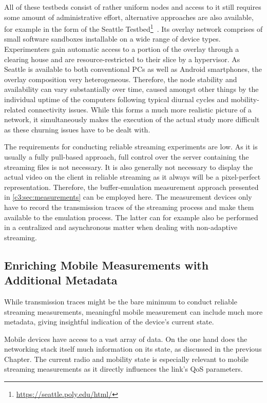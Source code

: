 All of these testbeds consist of rather uniform nodes and access to it still requires some amount of administrative effort, alternative approaches are also available, for example in the form of the Seattle Testbed\footnote{\url{https://seattle.poly.edu/html/}}~\cite{Cappos:2009:SPE:1508865.1508905}. Its overlay network comprises of small software sandboxes installable on a wide range of device types. Experimenters gain automatic access to a portion of the overlay through a clearing house and are resource-restricted to their slice by a hypervisor. As Seattle is available to both conventional PCs as well as Android smartphones, the overlay composition very heterogeneous. Therefore, the node stability and availability can vary substantially over time, caused amongst other things by the individual uptime of the computers following typical diurnal cycles and mobility-related connectivity issues.
While this forms a much more realistic picture of a network, it simultaneously makes the execution of the actual study more difficult as these churning issues have to be dealt with.

The requirements for conducting reliable streaming experiments are low. As it is usually a fully pull-based approach, full control over the server containing the streaming files is not necessary. It is also generally not necessary to display the actual video on the client in reliable streaming as it always will be a pixel-perfect representation. Therefore, the buffer-emulation measurement approach presented in \ref{c3:sec:measurements} can be employed here. The measurement devices only have to record the transmission traces of the streaming process and make them available to the emulation process. The latter can for example also be performed in a centralized and asynchronous matter when dealing with non-adaptive streaming.


\subsection{Enriching Mobile Measurements with Additional Metadata}
\label{c6:sec:sensorium}

While transmission traces might be the bare minimum to conduct reliable streaming measurements, meaningful mobile measurement can include much more metadata, giving insightful indication of the device's current state.

Mobile devices have access to a vast array of data. On the one hand does the networking stack itself much information on its state, as discussed in the previous Chapter. The current radio and mobility state is especially relevant to mobile streaming measurements as it directly influences the link's \gls{QoS} parameters. 

